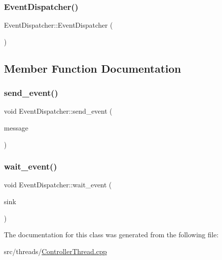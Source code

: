 \subsubsection{\texorpdfstring{Event\+Dispatcher()}{EventDispatcher()}}
{\footnotesize\ttfamily Event\+Dispatcher\+::\+Event\+Dispatcher (\begin{DoxyParamCaption}{ }\end{DoxyParamCaption})\hspace{0.3cm}{\ttfamily [inline]}}



\subsection{Member Function Documentation}
\mbox{\label{classEventDispatcher_a17ee873402eb3abbb1e3cd5fa1fadafc}} 
\subsubsection{\texorpdfstring{send\+\_\+event()}{send\_event()}}
{\footnotesize\ttfamily void Event\+Dispatcher\+::send\+\_\+event (\begin{DoxyParamCaption}\item[{const string \&}]{message }\end{DoxyParamCaption})\hspace{0.3cm}{\ttfamily [inline]}}

\mbox{\label{classEventDispatcher_af52dcf785f0c33b88c5b96bb91c6610c}} 
\subsubsection{\texorpdfstring{wait\+\_\+event()}{wait\_event()}}
{\footnotesize\ttfamily void Event\+Dispatcher\+::wait\+\_\+event (\begin{DoxyParamCaption}\item[{Data\+Sink $\ast$}]{sink }\end{DoxyParamCaption})\hspace{0.3cm}{\ttfamily [inline]}}



The documentation for this class was generated from the following file\+:\begin{DoxyCompactItemize}
\item 
src/threads/\hyperlink{ControllerThread_8cpp}{Controller\+Thread.\+cpp}\end{DoxyCompactItemize}
